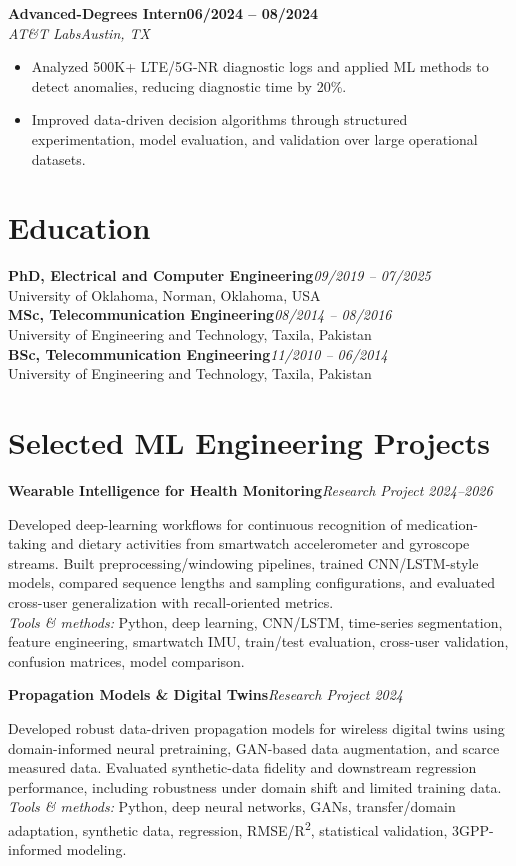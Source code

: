 \documentclass[10pt,letterpaper]{extarticle}
\newcommand{\role}[4]{\Needspace{3\baselineskip}\textbf{#1}\hfill\textbf{#2}\\[-1pt]\textit{#3}\hfill\textit{#4}\par}
\newcommand{\project}[3]{\Needspace{3\baselineskip}\textbf{#1}\hfill\textit{#2 \textbar{} #3}\par}
\begin{document}
\role{Advanced-Degrees Intern}{06/2024 -- 08/2024}{AT\&T Labs}{Austin, TX}
\begin{itemize}
\item Analyzed 500K+ LTE/5G-NR diagnostic logs and applied ML methods to detect anomalies, reducing diagnostic time by 20\%.
\item Improved data-driven decision algorithms through structured experimentation, model evaluation, and validation over large operational datasets.
\end{itemize}

\section{Education}
\textbf{PhD, Electrical and Computer Engineering}\hfill\textit{09/2019 -- 07/2025}\\
University of Oklahoma, Norman, Oklahoma, USA\\
\textbf{MSc, Telecommunication Engineering}\hfill\textit{08/2014 -- 08/2016}\\
University of Engineering and Technology, Taxila, Pakistan\\
\textbf{BSc, Telecommunication Engineering}\hfill\textit{11/2010 -- 06/2014}\\
University of Engineering and Technology, Taxila, Pakistan

\section{Selected ML Engineering Projects}
\project{Wearable Intelligence for Health Monitoring}{Research Project}{2024--2026}
Developed deep-learning workflows for continuous recognition of medication-taking and dietary activities from smartwatch accelerometer and gyroscope streams. Built preprocessing/windowing pipelines, trained CNN/LSTM-style models, compared sequence lengths and sampling configurations, and evaluated cross-user generalization with recall-oriented metrics.\\[-1pt]
{\small\textit{Tools \& methods:} Python, deep learning, CNN/LSTM, time-series segmentation, feature engineering, smartwatch IMU, train/test evaluation, cross-user validation, confusion matrices, model comparison.}

\project{Propagation Models \& Digital Twins}{Research Project}{2024}
Developed robust data-driven propagation models for wireless digital twins using domain-informed neural pretraining, GAN-based data augmentation, and scarce measured data. Evaluated synthetic-data fidelity and downstream regression performance, including robustness under domain shift and limited training data.\\[-1pt]
{\small\textit{Tools \& methods:} Python, deep neural networks, GANs, transfer/domain adaptation, synthetic data, regression, RMSE/R\textsuperscript{2}, statistical validation, 3GPP-informed modeling.}
\end{document}
